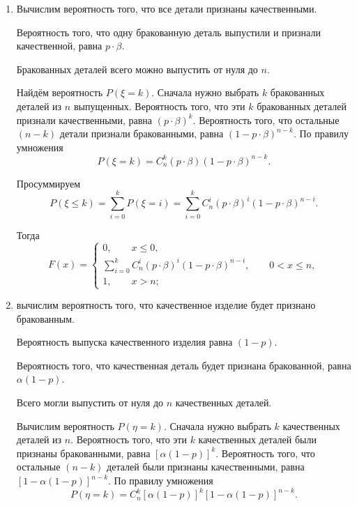 \begin{enumerate}[label=\alph*)]
\item Вычислим вероятность того, что все детали признаны качественными.

Вероятность того, что одну бракованную деталь выпустили и признали качественной, равна $p \cdot \beta $.

Бракованных деталей всего можно выпустить от нуля до $n$.

Найдём вероятность $P \left( \xi = k \right) $.
Сначала нужно выбрать $k$ бракованных деталей из $n$ выпущенных.
Вероятность того, что эти $k$ бракованных деталей признали качественными, равна $ \left( p \cdot \beta \right)^k$.
Вероятность того, что остальные $ \left( n - k \right) $ детали признали бракованными, равна $ \left( 1 - p \cdot \beta \right)^{n-k}$.
По правилу умножения
$$P \left( \xi = k \right) =
C_n^k \left( p \cdot \beta \right) \left( 1 - p \cdot \beta \right)^{n-k}.$$

Просуммируем
$$P \left( \xi \leq k \right) =
\sum \limits_{i=0}^k P \left( \xi = i \right) =
\sum \limits_{i=0}^k C_n^i \left( p \cdot \beta \right)^i \left( 1 - p \cdot \beta \right)^{n-i}.$$

Тогда
$$F \left( x \right) =
\begin{cases}
0, \qquad x \leq 0, \\
\sum \limits_{i=0}^k C_n^i \left( p \cdot \beta \right)^i \left( 1 - p \cdot \beta \right)^{n-i}, \qquad 0 < x \leq n, \\
1, \qquad x > n;
\end{cases}$$
\item вычислим вероятность того, что качественное изделие будет признано бракованным.

Вероятность выпуска качественного изделия равна $ \left( 1 - p \right) $.

Вероятность того, что качественная деталь будет признана бракованной, равна $ \alpha \left( 1 - p \right) $.

Всего могли выпустить от нуля до $n$ качественных деталей.

Вычислим вероятность $P \left( \eta = k \right) $.
Сначала нужно выбрать $k$ качественных деталей из $n$.
Вероятность того, что эти $k$ качественных деталей были признаны бракованными, равна $ \left[ \alpha \left( 1 - p \right) \right]^k$.
Вероятность того, что остальные $ \left( n - k \right) $ деталей были признаны качественными,
равна $ \left[ 1 - \alpha \left( 1 - p \right) \right]^{n-k}$.
По правилу умножения
$$P \left( \eta = k \right) =
C_n^k \left[ \alpha \left( 1 - p \right) \right]^k \left[ 1 - \alpha \left( 1 - p \right) \right]^{n-k}.$$


\end{enumerate}
